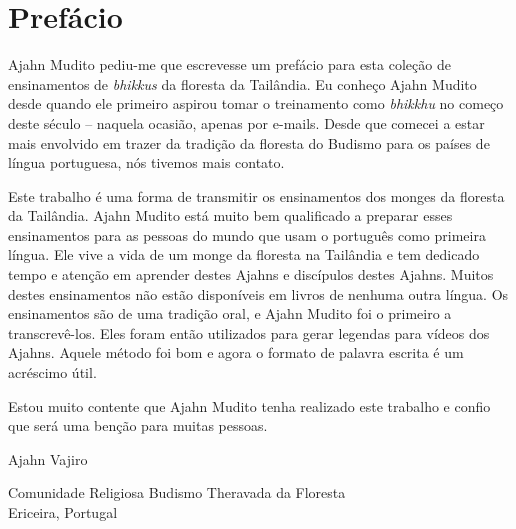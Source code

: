 
\chapter{Prefácio}

Ajahn Mudito pediu-me que escrevesse um prefácio para esta coleção
de ensinamentos de \textit{bhikkus} da floresta da Tailândia. Eu
conheço Ajahn Mudito desde quando ele primeiro aspirou tomar o
treinamento como \textit{bhikkhu} no começo deste século – naquela
ocasião, apenas por e-mails. Desde que comecei a estar mais envolvido
em trazer da tradição da floresta do Budismo para os países de língua
portuguesa, nós tivemos mais contato.

Este trabalho é uma forma de transmitir os ensinamentos dos monges
da floresta da Tailândia. Ajahn Mudito está muito bem qualificado a
preparar esses ensinamentos para as pessoas do mundo que usam o
português como primeira língua. Ele vive a vida de um monge da floresta
na Tailândia e tem dedicado tempo e atenção em aprender destes Ajahns e
discípulos destes Ajahns. Muitos destes ensinamentos não estão
disponíveis em livros de nenhuma outra língua. Os ensinamentos são de
uma tradição oral, e Ajahn Mudito foi o primeiro a transcrevê-los. Eles
foram então utilizados para gerar legendas para vídeos dos Ajahns.
Aquele método foi bom e agora o formato de palavra escrita é um
acréscimo útil.

Estou muito contente que Ajahn Mudito tenha realizado este trabalho
e confio que será uma benção para muitas pessoas.

\bigskip

{\raggedleft
Ajahn Vajiro

Comunidade Religiosa Budismo Theravada da Floresta\\
Ericeira, Portugal
\par}

